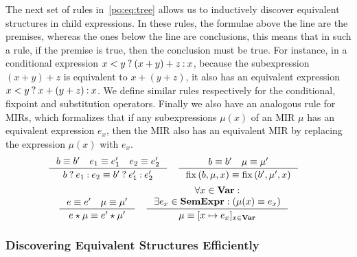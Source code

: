 The next set of rules in~\eqref{po:eq:tree} allows us to inductively discover
equivalent structures in child expressions.  In these rules, the formulae above
the line are the premises, whereas the ones below the line are conclusions,
this means that in such a rule, if the premise is true, then the conclusion
must be true.  For instance, in a conditional expression $x < y\mathbin{?}(x
+ y) + z\mathbin{:} x$, because the subexpression $(x + y) + z$ is equivalent to $x
+ (y + z)$, it also has an equivalent expression $x < y\mathbin{?} x + (y +
z)\mathbin{:} x$.  We define similar rules respectively for the conditional, fixpoint
and substitution operators.  Finally we also have an analogous rule for MIRs,
which formalizes that if any subexpressions $\mu(x)$ of an MIR $\mu$ has
an equivalent expression $e_x$, then the MIR also has an equivalent MIR by
replacing the expression $\mu(x)$ with $e_x$.
\begin{equation}
    \begin{aligned}
        \inference{%
            b \eqrel b^\prime \quad
            e_1 \eqrel e^\prime_1 \quad
            e_2 \eqrel e^\prime_2
        }{%
            \select{b}{e_1}{e_2} \eqrel
            \select{b^\prime}{e^\prime_1}{e^\prime_2}
        }
        & \quad
        \inference{%
            b \eqrel b^\prime \quad
            \mu \eqrel \mu^\prime
        }{%
            \fixpoint{b, \mu, x} \eqrel \fixpoint{b^\prime, \mu^\prime, x}
        }
    \end{aligned}
    \nonumber
\end{equation}
\vspace{-10pt}
\begin{equation}
    \begin{aligned}
        \inference{%
            e \eqrel e^\prime \quad
            \mu \eqrel \mu^\prime
        }{%
            e \expand \mu \eqrel e^\prime \expand \mu^\prime
        }
        & \quad
        \inference{%
            \forall x \in \varset: \\
            \exists e_x \in \sexprset:
            \left( \mu(x) \eqrel e_x \right)
        }{%
            \mu \eqrel [x \mapsto e_x]_{x \in \varset}
        }
    \end{aligned}
    \label{po:eq:tree}
\end{equation}

\subsubsection{Discovering Equivalent Structures Efficiently}

